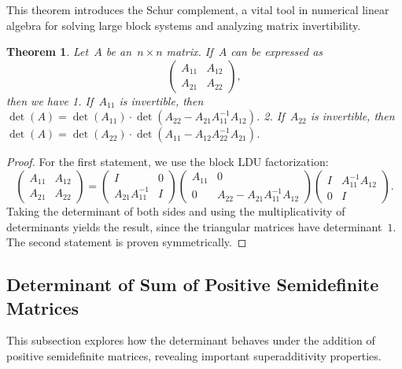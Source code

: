 \documentclass[12pt]{article}
\newtheorem{theorem}{Theorem}[section]
\begin{document}
\noindent This theorem introduces the Schur complement, a vital tool in numerical linear algebra for solving large block systems and analyzing matrix invertibility.
\begin{theorem}
Let~$A$ be an~$n \times n$ matrix. If~$A$ can be expressed as
\[ \begin{pmatrix} A_{11} & A_{12} \\ A_{21} & A_{22} \end{pmatrix}, \]
then we have
1. If~$A_{11}$ is invertible, then~$\det(A) = \det(A_{11}) \cdot \det(A_{22} - A_{21}A_{11}^{-1}A_{12})$.
2. If~$A_{22}$ is invertible, then~$\det(A) = \det(A_{22}) \cdot \det(A_{11} - A_{12}A_{22}^{-1}A_{21})$.
\end{theorem}
\begin{proof}
For the first statement, we use the block LDU factorization:
\[ \begin{pmatrix} A_{11} & A_{12} \\ A_{21} & A_{22} \end{pmatrix} = \begin{pmatrix} I & 0 \\ A_{21}A_{11}^{-1} & I \end{pmatrix} \begin{pmatrix} A_{11} & 0 \\ 0 & A_{22} - A_{21}A_{11}^{-1}A_{12} \end{pmatrix} \begin{pmatrix} I & A_{11}^{-1}A_{12} \\ 0 & I \end{pmatrix}. \]
Taking the determinant of both sides and using the multiplicativity of determinants yields the result, since the triangular matrices have determinant~$1$. The second statement is proven symmetrically.
\end{proof}

\subsection{Determinant of Sum of Positive Semidefinite Matrices}
This subsection explores how the determinant behaves under the addition of positive semidefinite matrices, revealing important superadditivity properties.
\end{document}
